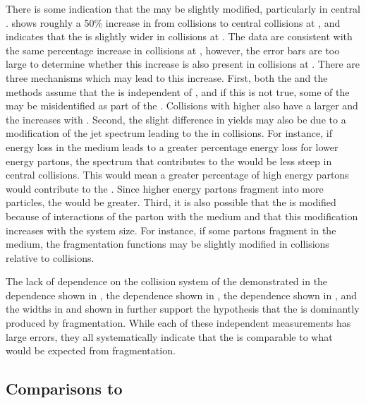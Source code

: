 There is some indication that the \jlc may be slightly modified, particularly in central \Au.   shows roughly a 50\% increase in \njet from \dAu collisions to central \Au collisions at \sNNtwohundred, and  indicates that the \jlc is slightly wider in \Au collisions at \sNNtwohundred.  The data are consistent with the same percentage increase in \Au collisions at \sNNsixtytwo, however, the error bars are too large to determine whether this increase is also present in collisions at \sNNsixtytwo.  There are three mechanisms which may lead to this increase.  First, both the \dphi and the \deta methods assume that the \ridge is independent of \deta, and if this is not true, some of the \ridge may be misidentified as part of the \jlc.  Collisions with higher \npart also have a larger \ridge and the \ridge increases with \npart.  Second, the slight difference in yields may also be due to a modification of the jet spectrum leading to the \jlc in \Au collisions.  For instance, if energy loss in the medium leads to a greater percentage energy loss for lower energy partons, the spectrum that contributes to the \jlc would be less steep in central \Au collisions.  This would mean a greater percentage of high energy partons would contribute to the \jlc.  Since higher energy partons fragment into more particles, the \jly would be greater.  Third, it is also possible that the \jlc is modified because of interactions of the parton with the medium and that this modification increases with the system size.  For instance, if some partons fragment in the medium, the fragmentation functions may be slightly modified in \AplusA collisions relative to \pp collisions.

The lack of dependence on the collision system of the \jlc demonstrated in the \pttrig dependence shown in , the \ptassoc dependence shown in , the \npart dependence shown in , and the widths in \dphi and \deta shown in  further support the hypothesis that the \jlc is dominantly produced by fragmentation.  While each of these independent measurements has large errors, they all systematically indicate that the \jlc is comparable to what would be expected from fragmentation.



\subsection{Comparisons to \py}

